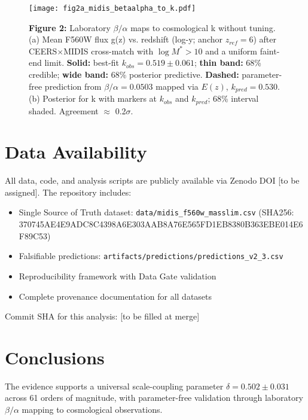 \documentclass[aps,prd,preprint,onecolumn,nofootinbib,longbibliography]{revtex4-2}
\begin{document}
\begin{figure}[htbp]
\centering
\texttt{[image: fig2a\_midis\_betaalpha\_to\_k.pdf]}
\caption{\textbf{Figure 2:} Laboratory $\beta/\alpha$ maps to cosmological k without tuning. (a) Mean F560W flux g(z) vs. redshift (log-y; anchor $z_{ref}=6$) after CEERS$\times$MIDIS cross-match with $\log M^* > 10$ and a uniform faint-end limit. \textbf{Solid:} best-fit $k_{obs} = 0.519 \pm 0.061$; \textbf{thin band:} 68\% credible; \textbf{wide band:} 68\% posterior predictive. \textbf{Dashed:} parameter-free prediction from $\beta/\alpha = 0.0503$ mapped via $E(z)$, $k_{pred} = 0.530$. (b) Posterior for k with markers at $k_{obs}$ and $k_{pred}$; 68\% interval shaded. Agreement $\approx$ 0.2$\sigma$.}
\label{fig:beta-alpha-k}
\end{figure}

\section{Data Availability}

All data, code, and analysis scripts are publicly available via Zenodo DOI [to be assigned]. The repository includes:
\begin{itemize}
\item Single Source of Truth dataset: \texttt{data/midis\_f560w\_masslim.csv} (SHA256: 370745AE4E9ADC8C4398A6E303AAB8A76E565FD1EB8380B363EBE014E6F89C53)
\item Falsifiable predictions: \texttt{artifacts/predictions/predictions\_v2\_3.csv}
\item Reproducibility framework with Data Gate validation
\item Complete provenance documentation for all datasets
\end{itemize}

Commit SHA for this analysis: [to be filled at merge]

\section{Conclusions}

The evidence supports a universal scale-coupling parameter $\delta = 0.502 \pm 0.031$ across 61 orders of magnitude, with parameter-free validation through laboratory $\beta/\alpha$ mapping to cosmological observations.


\end{document}
